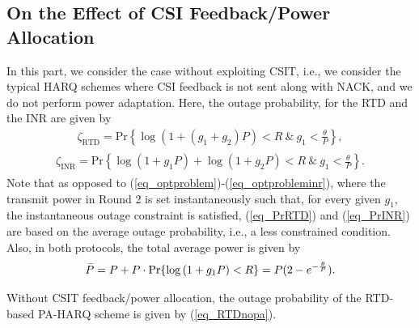 \subsection{On the Effect of CSI Feedback/Power Allocation}
In this part, we consider the case without exploiting CSIT, i.e., we consider the typical HARQ schemes where CSI feedback is not sent along with NACK, and we do not perform power adaptation.  Here, the outage probability,  for the RTD and the INR  are given by
\begin{align}\label{eq_PrRTD}
    \zeta_{\text{RTD}} = \text{Pr}\left\{\log\left(1+\left(g_1+g_2\right)P\right)<R ~\&~ g_1<\frac{\theta}{P}  \right\},
\end{align}
\begin{align}\label{eq_PrINR}
\begin{split}
    \zeta_{\text{INR}}=\text{Pr}\left\{\log\left(1+g_1P\right) + \log\left(1+g_2P\right)<R ~\&~ g_1<\frac{\theta}{P}\right\}.
\end{split}
\end{align}
Note that as opposed to (\ref{eq_optproblem})-(\ref{eq_optprobleminr}), where the transmit power in Round 2 is set instantaneously such that, for every given $g_1$, the instantaneous outage constraint is satisfied, (\ref{eq_PrRTD}) and (\ref{eq_PrINR}) are based on the average outage probability, i.e., a less constrained condition. Also, in both protocols, the total average power is given by
\begin{align}\label{eq_barpbench}
    \Bar{P} = P + P\cdot\text{Pr}\{\log\left(1+g_1P\right)<R\}=P(2-e^{-\frac{\theta}{P}}).
\end{align}
\begin{theorem}\label{theorem2}
Without CSIT feedback/power allocation, the outage probability of the RTD-based PA-HARQ scheme is given by (\ref{eq_RTDnopa}).
\end{theorem}
